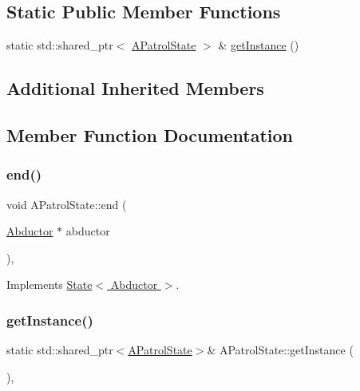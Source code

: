 \subsection*{Static Public Member Functions}
\begin{DoxyCompactItemize}
\item 
static std\+::shared\+\_\+ptr$<$ \hyperlink{class_a_patrol_state}{A\+Patrol\+State} $>$ \& \hyperlink{class_a_patrol_state_a9f5886d57fedbbf0baef217e9dcb674f}{get\+Instance} ()
\end{DoxyCompactItemize}
\subsection*{Additional Inherited Members}


\subsection{Member Function Documentation}
\mbox{\label{class_a_patrol_state_ad4e43d5ad9c9aa4ec543b836b58c06e8}} 
\subsubsection{\texorpdfstring{end()}{end()}}
{\footnotesize\ttfamily void A\+Patrol\+State\+::end (\begin{DoxyParamCaption}\item[{\hyperlink{class_abductor}{Abductor} $\ast$}]{abductor }\end{DoxyParamCaption})\hspace{0.3cm}{\ttfamily [override]}, {\ttfamily [virtual]}}



Implements \hyperlink{class_state_a97d058722f988c008e912a0e5ec879b3}{State$<$ Abductor $>$}.

\mbox{\label{class_a_patrol_state_a9f5886d57fedbbf0baef217e9dcb674f}} 
\subsubsection{\texorpdfstring{get\+Instance()}{getInstance()}}
{\footnotesize\ttfamily static std\+::shared\+\_\+ptr$<$\hyperlink{class_a_patrol_state}{A\+Patrol\+State}$>$\& A\+Patrol\+State\+::get\+Instance (\begin{DoxyParamCaption}{ }\end{DoxyParamCaption})\hspace{0.3cm}{\ttfamily [inline]}, {\ttfamily [static]}}

